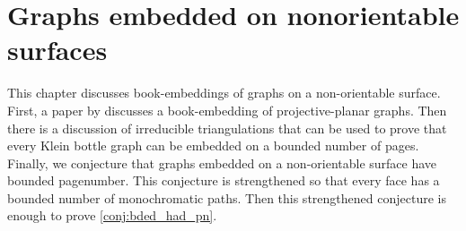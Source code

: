 \chapter{Graphs embedded on nonorientable surfaces}\label{chap:nonorientable}

This chapter discusses book-embeddings of graphs on a non-orientable surface. First, a paper by \textcite{nakamotoBookEmbeddingProjectiveplanar2015} discusses a book-embedding of projective-planar graphs. Then there is a discussion of irreducible triangulations that can be used to prove that every Klein bottle graph can be embedded on a bounded number of pages. Finally, we conjecture that graphs embedded on a non-orientable surface have bounded pagenumber. This conjecture is strengthened so that every face has a bounded number of monochromatic paths. Then this strengthened conjecture is enough to prove \cref{conj:bded_had_pn}.







